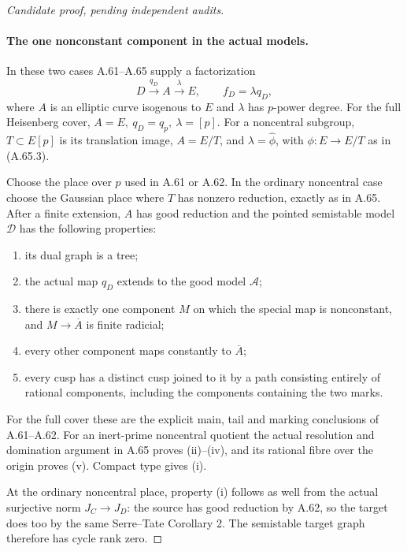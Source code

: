 \begin{proof}[Candidate proof, pending independent audits]
\paragraph{The one nonconstant component in the actual models.}
In these two cases A.61--A.65 supply a factorization
\[
       D\xrightarrow{q_D} A\xrightarrow{\lambda}E,
       \qquad f_D=\lambda q_D ,
                                                               \tag{A.66.5}
\]
where \(A\) is an elliptic curve isogenous to \(E\) and
\(\lambda\) has \(p\)-power degree. For the full Heisenberg
cover, \(A=E,\ q_D=q_p,\ \lambda=[p]\). For a noncentral
subgroup, \(T\subset E[p]\) is its translation image,
\(A=E/T\), and \(\lambda=\widehat\phi\), with
\(\phi:E\to E/T\) as in (A.65.3).

Choose the place over \(p\) used in A.61 or A.62. In the
ordinary noncentral case choose the Gaussian place where
\(T\) has nonzero reduction, exactly as in A.65. After a
finite extension, \(A\) has good reduction and the pointed
semistable model \(\mathcal D\) has the following properties:

\begin{enumerate}
\item its dual graph is a tree;
\item the actual map \(q_D\) extends to the good model
\(\mathcal A\);
\item there is exactly one component \(M\) on which the
special map is nonconstant, and
\(M\to\overline A\) is finite radicial;
\item every other component maps constantly to
\(\overline A\);
\item every cusp has a distinct cusp joined to it by a path
consisting entirely of rational components, including the
components containing the two marks.
\end{enumerate}

For the full cover these are the explicit main, tail and
marking conclusions of A.61--A.62. For an inert-prime
noncentral quotient the actual resolution and domination
argument in A.65 proves (ii)--(iv), and its rational fibre
over the origin proves (v). Compact type gives (i).

At the ordinary noncentral place, property (i) follows
as well from the actual surjective norm \(J_C\to J_D\):
the source has good reduction by A.62, so the target
does too by the same Serre--Tate Corollary 2. The
semistable target graph therefore has cycle rank zero.


\end{proof}
